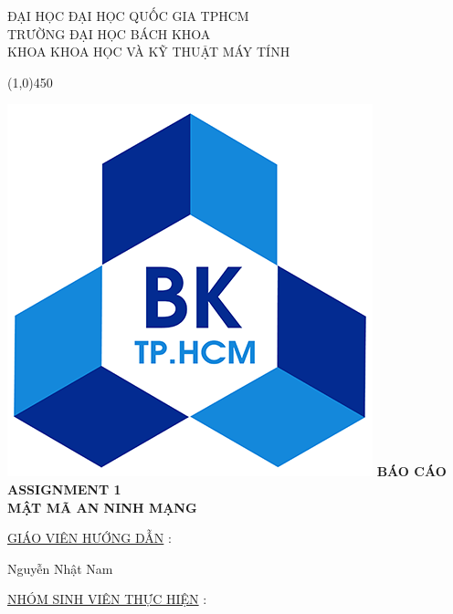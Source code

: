 \documentclass[paper=a4, fontsize=11pt]{scrartcl}	%
\numberwithin{equation}{section}															%
\numberwithin{figure}{section}																%
\numberwithin{table}{section}																%
\begin{document}
\begin{center}

{\huge ĐẠI HỌC ĐẠI HỌC QUỐC GIA TPHCM}\\
 \vspace{2mm} %
 {\LARGE TRƯỜNG ĐẠI HỌC BÁCH KHOA}\\
 \vspace{2mm} %
 {\LARGE KHOA KHOA HỌC VÀ KỸ THUẬT MÁY TÍNH}\\
 \begin{center}
\line(1,0){450}
\end{center}

\vspace{5mm} %
\includegraphics[scale=1]{logo_hscmut} \break
\vspace{5mm} %
\break
\vspace{5mm} %
\textbf{\Huge BÁO CÁO ASSIGNMENT 1}\\[0.5cm]
\textbf{\huge MẬT MÃ AN NINH MẠNG}\\[1cm]

\begin{flushleft}
\underline{\Large GIÁO VIÊN HƯỚNG DẪN}  :\\[0.5cm]
 \end{flushleft}
 
  

  {\large Nguyễn Nhật Nam } \\[0.5cm]

 \begin{flushleft}
\underline{\Large NHÓM SINH VIÊN THỰC HIỆN} :\\[0.5cm]
 \end{flushleft}


\end{center}
\end{document}
